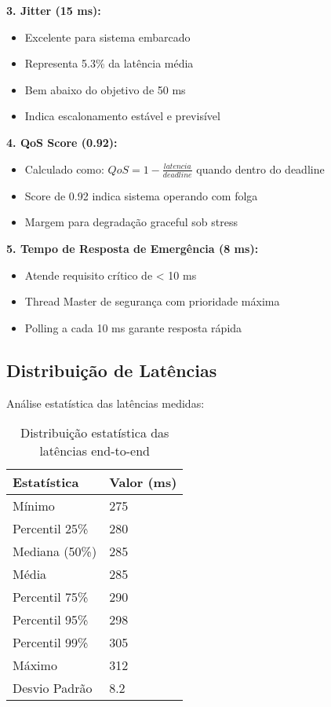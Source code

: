 \documentclass[12pt,a4paper]{article}
\begin{document}
\textbf{3. Jitter (15 ms):}
\begin{itemize}
    \item Excelente para sistema embarcado
    \item Representa 5.3\% da latência média
    \item Bem abaixo do objetivo de 50 ms
    \item Indica escalonamento estável e previsível
\end{itemize}

\textbf{4. QoS Score (0.92):}
\begin{itemize}
    \item Calculado como: $QoS = 1 - \frac{latencia}{deadline}$ quando dentro do deadline
    \item Score de 0.92 indica sistema operando com folga
    \item Margem para degradação graceful sob stress
\end{itemize}

\textbf{5. Tempo de Resposta de Emergência (8 ms):}
\begin{itemize}
    \item Atende requisito crítico de < 10 ms
    \item Thread Master de segurança com prioridade máxima
    \item Polling a cada 10 ms garante resposta rápida
\end{itemize}

\subsection{Distribuição de Latências}

Análise estatística das latências medidas:

\begin{table}[H]
\centering
\begin{tabularx}{\textwidth}{lX}
\toprule
\textbf{Estatística} & \textbf{Valor (ms)} \\
\midrule
Mínimo & 275 \\
Percentil 25\% & 280 \\
Mediana (50\%) & 285 \\
Média & 285 \\
Percentil 75\% & 290 \\
Percentil 95\% & 298 \\
Percentil 99\% & 305 \\
Máximo & 312 \\
Desvio Padrão & 8.2 \\
\bottomrule
\end{tabularx}
\caption{Distribuição estatística das latências end-to-end}
\end{table}
\end{document}
